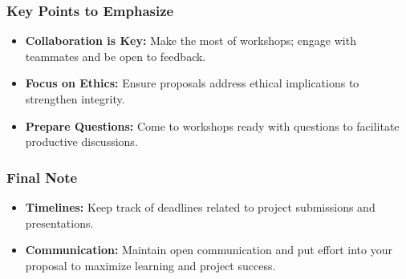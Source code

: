 \documentclass[aspectratio=169]{beamer}
\begin{document}
\begin{frame}[fragile]
    \frametitle{Key Points to Emphasize}
    \begin{itemize}
        \item \textbf{Collaboration is Key:} 
        Make the most of workshops; engage with teammates and be open to feedback.
        \item \textbf{Focus on Ethics:} 
        Ensure proposals address ethical implications to strengthen integrity.
        \item \textbf{Prepare Questions:} 
        Come to workshops ready with questions to facilitate productive discussions.
    \end{itemize}
\end{frame}

\begin{frame}[fragile]
    \frametitle{Final Note}
    \begin{itemize}
        \item \textbf{Timelines:} 
        Keep track of deadlines related to project submissions and presentations.
        \item \textbf{Communication:} 
        Maintain open communication and put effort into your proposal to maximize learning and project success.
    \end{itemize}
\end{frame}
\end{document}
